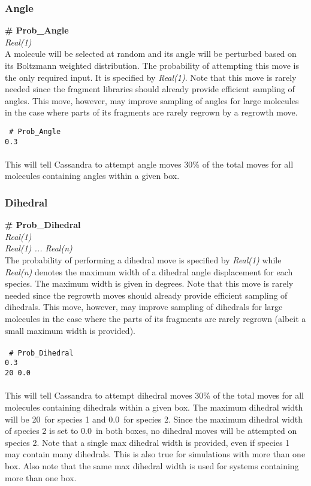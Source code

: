 \subsubsection{Angle}
{\bf \# Prob\_Angle} \\
{\it Real(1)} \\
A molecule will be selected at random and its angle will be perturbed based on its Boltzmann weighted distribution.
The probability of attempting this move is the only required input. It is specified by {\it Real(1)}. Note that this move is rarely needed since the fragment libraries should already provide efficient sampling of angles. This move, however, may improve sampling of angles for large molecules in the case where parts of its fragments are rarely regrown by a regrowth move.

%
\texttt{
\# Prob\_Angle \\
0.3 \\
} \\
%
This will tell Cassandra to attempt angle moves 30\% of the total moves for all molecules containing angles within a given box.

%
%
\subsubsection{Dihedral}
{\bf \# Prob\_Dihedral} \\
{\it Real(1)} \\
{\it Real(1) ... Real(n)} \\

The probability of performing a dihedral move is specified by {\it Real(1)} while
{\it Real(n)} denotes the maximum width of a dihedral angle displacement for each species. The maximum width is given in degrees. Note that this move is rarely needed since the regrowth moves should already provide efficient sampling of dihedrals. This move, however, may improve sampling of dihedrals for large molecules in the case where the parts of its fragments are rarely regrown (albeit a small maximum width is provided).\\ \\
%
\texttt{
\# Prob\_Dihedral \\
0.3 \\
20 0.0 \\
}\\
%
This will tell Cassandra to attempt dihedral moves 30\% of the total moves for all molecules containing dihedrals within a given box.
The maximum dihedral width will be 20\degree\ for species 1 and 0.0\degree\
for species 2. Since the maximum dihedral
width of species 2 is set to 0.0\degree\ in both boxes, no dihedral moves will be
attempted on species 2. Note that a single max dihedral width is provided, even if species 1 may contain many dihedrals. This is also true
for simulations with more than one box. Also note that the same max dihedral width is used for systems containing  more than one box.

